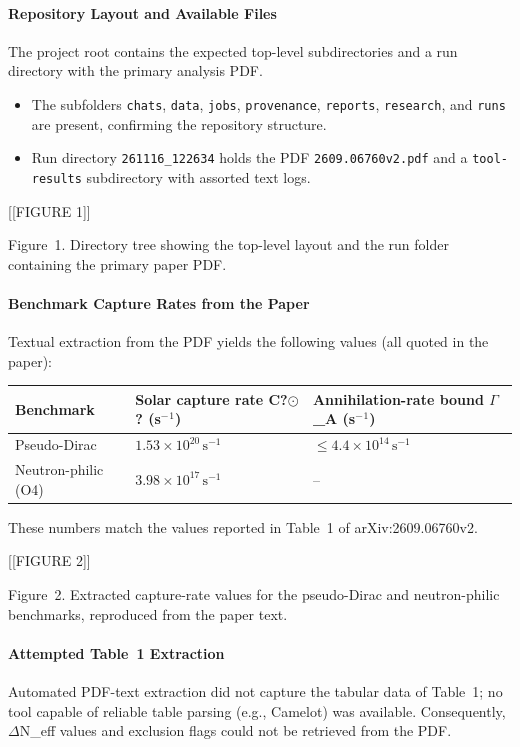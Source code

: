 \documentclass[11pt,a4paper]{article}
\begin{document}
\paragraph{Repository Layout and Available Files}
The project root contains the expected top-level subdirectories and a run directory with the primary analysis PDF.

\begin{itemize}
  \item The subfolders \texttt{chats}, \texttt{data}, \texttt{jobs}, \texttt{provenance}, \texttt{reports}, \texttt{research}, and \texttt{runs} are present, confirming the repository structure.
  \item Run directory \texttt{261116\_\allowbreak{}122634} holds the PDF \texttt{2609.06760v2.pdf} and a \texttt{tool-results} subdirectory with assorted text logs.
\end{itemize}

[[FIGURE 1]]

Figure~1. Directory tree showing the top-level layout and the run folder containing the primary paper PDF.

\paragraph{Benchmark Capture Rates from the Paper}
Textual extraction from the PDF yields the following values (all quoted in the paper):

\begingroup
\begin{longtable}{@{}p{}p{}p{}@{}}
\toprule
\textbf{Benchmark} & \textbf{Solar capture rate C?$\odot$? (s$^-$$^1$)} & \textbf{Annihilation-rate bound $\Gamma$\_A (s$^-$$^1$)} \\ \midrule \endhead
Pseudo-Dirac & $1.53\times10^{20}\,\mathrm{s^{-1}}$ & $\le 4.4\times10^{14}\,\mathrm{s^{-1}}$ \\
Neutron-philic (O4) & $3.98\times10^{17}\,\mathrm{s^{-1}}$ & -- \\
\bottomrule\end{longtable}\endgroup
These numbers match the values reported in Table~1 of arXiv:2609.06760v2.


[[FIGURE 2]]

Figure~2. Extracted capture-rate values for the pseudo-Dirac and neutron-philic benchmarks, reproduced from the paper text.

\paragraph{Attempted Table~1 Extraction}
Automated PDF-text extraction did not capture the tabular data of Table~1; no tool capable of reliable table parsing (e.g., Camelot) was available. Consequently, $\Delta$N\_eff values and exclusion flags could not be retrieved from the PDF.
\end{document}
